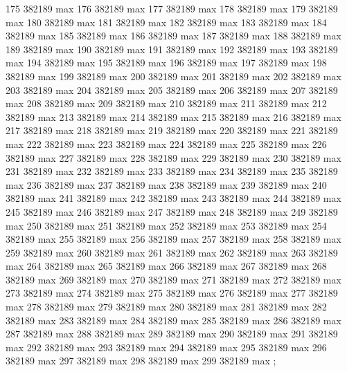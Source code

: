 {175 382189 max
176 382189 max
177 382189 max
178 382189 max
179 382189 max
180 382189 max
181 382189 max
182 382189 max
183 382189 max
184 382189 max
185 382189 max
186 382189 max
187 382189 max
188 382189 max
189 382189 max
190 382189 max
191 382189 max
192 382189 max
193 382189 max
194 382189 max
195 382189 max
196 382189 max
197 382189 max
198 382189 max
199 382189 max
200 382189 max
201 382189 max
202 382189 max
203 382189 max
204 382189 max
205 382189 max
206 382189 max
207 382189 max
208 382189 max
209 382189 max
210 382189 max
211 382189 max
212 382189 max
213 382189 max
214 382189 max
215 382189 max
216 382189 max
217 382189 max
218 382189 max
219 382189 max
220 382189 max
221 382189 max
222 382189 max
223 382189 max
224 382189 max
225 382189 max
226 382189 max
227 382189 max
228 382189 max
229 382189 max
230 382189 max
231 382189 max
232 382189 max
233 382189 max
234 382189 max
235 382189 max
236 382189 max
237 382189 max
238 382189 max
239 382189 max
240 382189 max
241 382189 max
242 382189 max
243 382189 max
244 382189 max
245 382189 max
246 382189 max
247 382189 max
248 382189 max
249 382189 max
250 382189 max
251 382189 max
252 382189 max
253 382189 max
254 382189 max
255 382189 max
256 382189 max
257 382189 max
258 382189 max
259 382189 max
260 382189 max
261 382189 max
262 382189 max
263 382189 max
264 382189 max
265 382189 max
266 382189 max
267 382189 max
268 382189 max
269 382189 max
270 382189 max
271 382189 max
272 382189 max
273 382189 max
274 382189 max
275 382189 max
276 382189 max
277 382189 max
278 382189 max
279 382189 max
280 382189 max
281 382189 max
282 382189 max
283 382189 max
284 382189 max
285 382189 max
286 382189 max
287 382189 max
288 382189 max
289 382189 max
290 382189 max
291 382189 max
292 382189 max
293 382189 max
294 382189 max
295 382189 max
296 382189 max
297 382189 max
298 382189 max
299 382189 max
};
